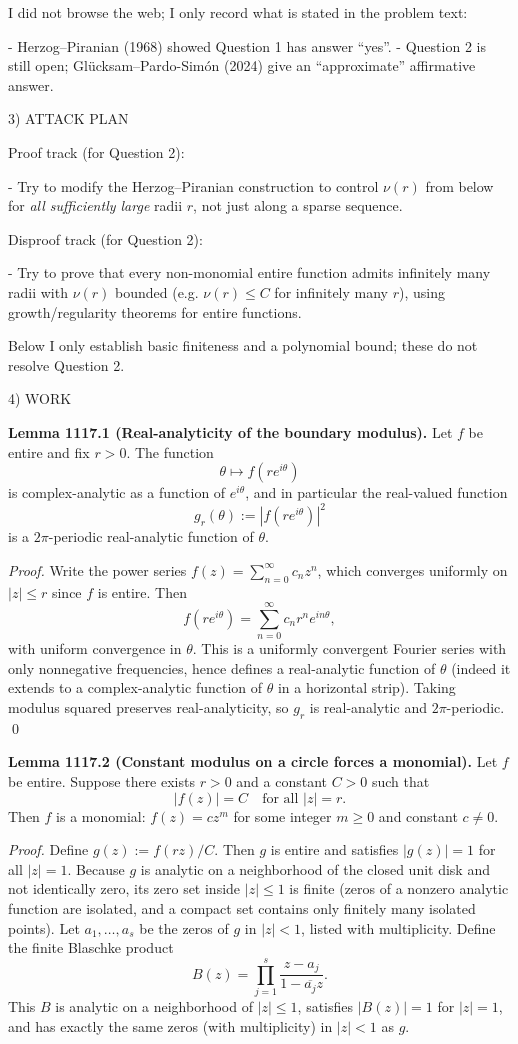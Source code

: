 I did not browse the web; I only record what is stated in the problem text:

- Herzog--Piranian (1968) showed Question 1 has answer ``yes''.
- Question 2 is still open; Gl\"ucksam--Pardo-Sim\'on (2024) give an ``approximate'' affirmative answer.

3) ATTACK PLAN

Proof track (for Question 2):

- Try to modify the Herzog--Piranian construction to control \(\nu(r)\) from below for \emph{all sufficiently large} radii \(r\), not just along a sparse sequence.

Disproof track (for Question 2):

- Try to prove that every non-monomial entire function admits infinitely many radii with \(\nu(r)\) bounded (e.g. \(\nu(r)\le C\) for infinitely many \(r\)), using growth/regularity theorems for entire functions.

Below I only establish basic finiteness and a polynomial bound; these do not resolve Question 2.

4) WORK

\textbf{Lemma 1117.1 (Real-analyticity of the boundary modulus).}
Let \(f\) be entire and fix \(r>0\). The function
\[
\theta\mapsto f(r e^{i\theta})
\]
is complex-analytic as a function of \(e^{i\theta}\), and in particular the real-valued function
\[
 g_r(\theta):=|f(r e^{i\theta})|^2
\]
is a \(2\pi\)-periodic real-analytic function of \(\theta\).

\emph{Proof.}
Write the power series \(f(z)=\sum_{n=0}^\infty c_n z^n\), which converges uniformly on \(|z|\le r\) since \(f\) is entire. Then
\[
 f(r e^{i\theta}) = \sum_{n=0}^\infty c_n r^n e^{i n\theta},
\]
with uniform convergence in \(\theta\). This is a uniformly convergent Fourier series with only nonnegative frequencies, hence defines a real-analytic function of \(\theta\) (indeed it extends to a complex-analytic function of \(\theta\) in a horizontal strip). Taking modulus squared preserves real-analyticity, so \(g_r\) is real-analytic and \(2\pi\)-periodic. \qed

\textbf{Lemma 1117.2 (Constant modulus on a circle forces a monomial).}
Let \(f\) be entire. Suppose there exists \(r>0\) and a constant \(C>0\) such that
\[
|f(z)|=C\quad\text{for all }|z|=r.
\]
Then \(f\) is a monomial: \(f(z)=c z^m\) for some integer \(m\ge 0\) and constant \(c\ne 0\).

\emph{Proof.}
Define \(g(z):=f(r z)/C\). Then \(g\) is entire and satisfies \(|g(z)|=1\) for all \(|z|=1\).
Because \(g\) is analytic on a neighborhood of the closed unit disk and not identically zero, its zero set inside \(|z|\le 1\) is finite (zeros of a nonzero analytic function are isolated, and a compact set contains only finitely many isolated points).
Let \(a_1,\dots,a_s\) be the zeros of \(g\) in \(|z|<1\), listed with multiplicity.
Define the finite Blaschke product
\[
B(z)=\prod_{j=1}^s \frac{z-a_j}{1-\overline{a_j}z}.
\]
This \(B\) is analytic on a neighborhood of \(|z|\le 1\), satisfies \(|B(z)|=1\) for \(|z|=1\), and has exactly the same zeros (with multiplicity) in \(|z|<1\) as \(g\).

